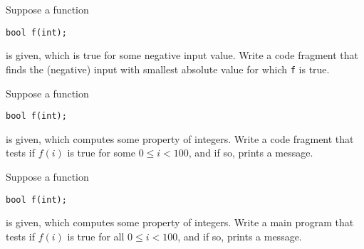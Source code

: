 \begin{review}
  \label{ex:cpp-funcloop2}
  Suppose a function
\begin{lstlisting}
bool f(int);
\end{lstlisting}
is given, which is true for some negative input value. Write a code fragment that
finds the (negative) input with smallest absolute value for which \lstinline{f} is true.
\end{review}

\begin{review}
  \label{ex:cpp-funcloop3}
  Suppose a function
\begin{lstlisting}
bool f(int);
\end{lstlisting}
is given, which computes some property of integers.
Write a code fragment that tests if $f(i)$ is true for some $0\leq
i<100$, and if so, prints a message.
\end{review}

\begin{review}
  \label{ex:cpp-funcloop4}
  Suppose a function
\begin{lstlisting}
bool f(int);
\end{lstlisting}
is given, which computes some property of integers.
Write a main program that tests if $f(i)$ is true for all $0\leq
i<100$, and if so, prints a message.
\end{review}

